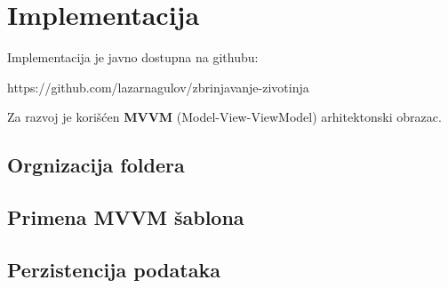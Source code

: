 \section{Implementacija}
\par Implementacija je javno dostupna na githubu: 
\begin{center}
    https://github.com/lazarnagulov/zbrinjavanje-zivotinja
\end{center}
\par Za razvoj je korišćen \textbf{MVVM} (Model-View-ViewModel) arhitektonski obrazac.
\subsection{Orgnizacija foldera}
\subsection{Primena MVVM šablona}
\subsection{Perzistencija podataka}